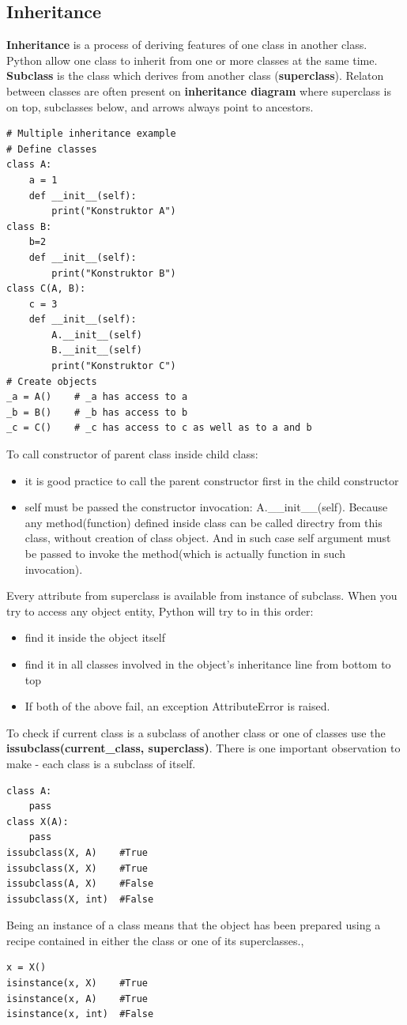 \documentclass{article}
\begin{document}
\subsection{Inheritance}
\textbf{Inheritance} is a process of deriving features of one class in another class. Python allow one class to inherit from one or more classes at the same time. \textbf{Subclass} is the class which derives from another class (\textbf{superclass}). Relaton between classes are often present on \textbf{inheritance diagram} where superclass is on top, subclasses below, and arrows always point to ancestors.
\begin{lstlisting}[style=pystyle]
# Multiple inheritance example
# Define classes
class A:
	a = 1
	def __init__(self):
		print("Konstruktor A")
class B:
	b=2
	def __init__(self):
		print("Konstruktor B")
class C(A, B):
	c = 3
	def __init__(self):
		A.__init__(self)
		B.__init__(self)
		print("Konstruktor C")
# Create objects
_a = A()	# _a has access to a
_b = B()	# _b has access to b
_c = C()	# _c has access to c as well as to a and b
\end{lstlisting}
To call constructor of parent class inside child class:
\begin{itemize}
\item it is good practice to call the parent constructor first in the child constructor
\item self must be passed the constructor invocation: A.\_\_init\_\_(self). Because any method(function) defined inside class can be called directry from this class, without creation of class object. And in such case self argument must be passed to invoke the method(which is actually function in such invocation).
\end{itemize}
Every attribute from superclass is available from instance of subclass. When you try to access any object entity, Python will try to in this order:
\begin{itemize}
\item find it inside the object itself
\item find it in all classes involved in the object's inheritance line from bottom to top
\item If both of the above fail, an exception AttributeError is raised.
\end{itemize}

To check if current class is a subclass of another class or one of classes use the \textbf{issubclass(current\_class, superclass)}. There is one important observation to make - each class is a subclass of itself. 
\begin{lstlisting}[style=pystyle]
class A:
	pass
class X(A):
	pass
issubclass(X, A)	#True
issubclass(X, X)	#True
issubclass(A, X)	#False
issubclass(X, int)	#False
\end{lstlisting}
Being an instance of a class means that the object has been prepared using a recipe contained in either the class or one of its superclasses.,
\begin{lstlisting}[style=pystyle]
x = X()
isinstance(x, X)	#True
isinstance(x, A)	#True
isinstance(x, int)	#False
\end{lstlisting}
\end{document}
